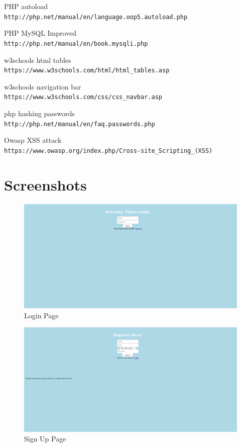 \documentclass{article}
\begin{document}
\begin{thebibliography}{10}
  
  PHP autoload
  \\\texttt{http://php.net/manual/en/language.oop5.autoload.php}
  
  PHP MySQL Improved
  \\\texttt{http://php.net/manual/en/book.mysqli.php}

  w3schools html tables
  \\\texttt{https://www.w3schools.com/html/html\_tables.asp}

  w3schools navigation bar
  \\\texttt{https://www.w3schools.com/css/css\_navbar.asp}

  php hashing passwords
  \\\texttt{http://php.net/manual/en/faq.passwords.php}

  Owasp XSS attack
  \\\texttt{https://www.owasp.org/index.php/Cross-site\_Scripting\_(XSS)}


\end{thebibliography}


\section{Screenshots}

\begin{figure}[!htb]
  \caption{Login Page}
  \center
  \includegraphics[scale=0.19]{image/login.png}
\end{figure}

\begin{figure}[!htb]
  \caption{Sign Up Page}
  \center
  \includegraphics[scale=0.19]{image/register.png}
\end{figure}
\end{document}
